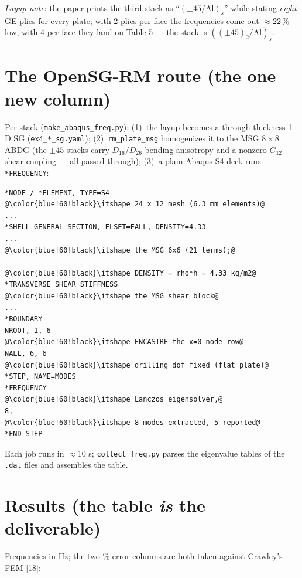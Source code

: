\documentclass[11pt]{article}
\newcommand{\code}[1]{\texttt{#1}}
\begin{document}
\noindent\emph{Layup note}: the paper prints the third stack as
``$(\pm45/\mathrm{Al})_s$'' while stating \emph{eight} GE plies for every
plate; with 2 plies per face the frequencies come out $\approx$22\,\% low,
with 4 per face they land on Table 5 --- the stack is
$((\pm45)_2/\mathrm{Al})_s$.

\section{The OpenSG-RM route (the one new column)}
Per stack (\code{make\_abaqus\_freq.py}):
(1)~the layup becomes a through-thickness 1-D SG
(\code{ex4\_*\_sg.yaml}); (2)~\code{rm\_plate\_msg} homogenizes it to the
MSG $8\times8$ ABDG (the $\pm45$ stacks carry $D_{16}/D_{26}$ bending
anisotropy and a nonzero $G_{12}$ shear coupling --- all passed through);
(3)~a plain Abaqus S4 deck runs \code{*FREQUENCY}:

\begin{lstlisting}[style=deck]
*NODE / *ELEMENT, TYPE=S4                @\color{blue!60!black}\itshape 24 x 12 mesh (6.3 mm elements)@
...
*SHELL GENERAL SECTION, ELSET=EALL, DENSITY=4.33
...                                      @\color{blue!60!black}\itshape the MSG 6x6 (21 terms);@
                                         @\color{blue!60!black}\itshape DENSITY = rho*h = 4.33 kg/m2@
*TRANSVERSE SHEAR STIFFNESS              @\color{blue!60!black}\itshape the MSG shear block@
...
*BOUNDARY
NROOT, 1, 6                              @\color{blue!60!black}\itshape ENCASTRE the x=0 node row@
NALL, 6, 6                               @\color{blue!60!black}\itshape drilling dof fixed (flat plate)@
*STEP, NAME=MODES
*FREQUENCY                               @\color{blue!60!black}\itshape Lanczos eigensolver,@
8,                                       @\color{blue!60!black}\itshape 8 modes extracted, 5 reported@
*END STEP
\end{lstlisting}

Each job runs in $\approx$10 s; \code{collect\_freq.py} parses the
eigenvalue tables of the \code{.dat} files and assembles the table.

\section{Results (the table \emph{is} the deliverable)}
Frequencies in Hz; the two \%-error columns are both taken against
Crawley's FEM [18]:
\end{document}
